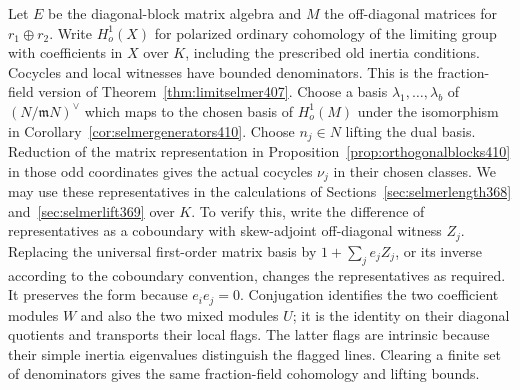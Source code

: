 \documentclass[a4paper,11pt]{article}
\theoremstyle{definition}
\theoremstyle{remark}
\numberwithin{equation}{section}
\begin{document}
Let \(E\) be the diagonal-block matrix algebra and \(M\) the
off-diagonal matrices for \(r_1\oplus r_2\). Write \(H^1_o(X)\)
for polarized ordinary cohomology of the limiting group with
coefficients in \(X\) over \(K\), including the prescribed
old inertia conditions. Cocycles and local witnesses have
bounded denominators. This is the fraction-field version of
Theorem~\ref{thm:limitselmer407}. Choose a basis
\(\lambda_1,\dots,\lambda_b\) of \((N/\mathfrak m N)^\vee\)
which maps to the chosen basis of \(H^1_o(M)\) under the
isomorphism in Corollary~\ref{cor:selmergenerators410}.
Choose \(n_j\in N\) lifting the dual basis. Reduction of the
matrix representation in Proposition~\ref{prop:orthogonalblocks410}
in those odd coordinates gives the actual cocycles
\(\nu_j\) in their chosen classes. We may use these representatives
in the calculations of Sections~\ref{sec:selmerlength368}
and~\ref{sec:selmerlift369} over \(K\). To verify this, write
the difference of representatives as a coboundary with
skew-adjoint off-diagonal witness \(Z_j\). Replacing the
universal first-order matrix basis by
\(1+\sum_j e_j Z_j\), or its inverse according to the
coboundary convention, changes the representatives as required.
It preserves the form because \(e_i e_j=0\). Conjugation
identifies the two coefficient modules \(W\) and also the
two mixed modules \(U\); it is the identity on their
diagonal quotients and transports their local flags. The
latter flags are intrinsic because their simple inertia
eigenvalues distinguish the flagged lines. Clearing a
finite set of denominators gives the same fraction-field
cohomology and lifting bounds.
\end{document}
